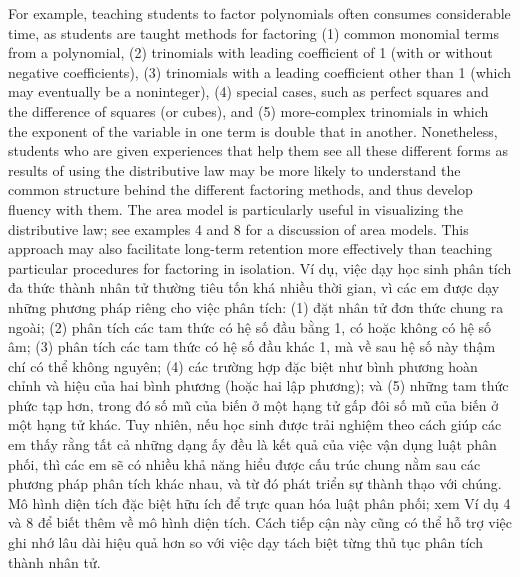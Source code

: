 \documentclass[
  10pt,
  a4paper,
  landscape,
  twoside,
  openany
]{scrbook}
\newcommand{\EN}[1]{#1}
\newcommand{\VI}[1]{#1}
\newcounter{example}
\begin{document}
\TriPara
{
\EN{For example, teaching students to factor polynomials often consumes considerable time, as students are taught methods for factoring (1) common monomial terms from a polynomial, (2) trinomials with leading coefficient of 1 (with or without negative coefficients), (3) trinomials with a leading coefficient other than 1 (which may eventually be a noninteger), (4) special cases, such as perfect squares and the difference of squares (or cubes), and (5) more-complex trinomials in which the exponent of the variable in one term is double that in another. Nonetheless, students who are given experiences that help them see all these different forms as results of using the distributive law may be more likely to understand the common structure behind the different factoring methods, and thus develop fluency with them. The area model is particularly useful in visualizing the distributive law; see examples 4 and 8 for a discussion of area models. This approach may also facilitate long-term retention more effectively than teaching particular procedures for factoring in isolation.}
}
{
\VI{Ví dụ, việc dạy học sinh phân tích đa thức thành nhân tử thường tiêu tốn khá nhiều thời gian, vì các em được dạy những phương pháp riêng cho việc phân tích: (1) đặt nhân tử đơn thức chung ra ngoài; (2) phân tích các tam thức có hệ số đầu bằng 1, có hoặc không có hệ số âm; (3) phân tích các tam thức có hệ số đầu khác 1, mà về sau hệ số này thậm chí có thể không nguyên; (4) các trường hợp đặc biệt như bình phương hoàn chỉnh và hiệu của hai bình phương (hoặc hai lập phương); và (5) những tam thức phức tạp hơn, trong đó số mũ của biến ở một hạng tử gấp đôi số mũ của biến ở một hạng tử khác. Tuy nhiên, nếu học sinh được trải nghiệm theo cách giúp các em thấy rằng tất cả những dạng ấy đều là kết quả của việc vận dụng luật phân phối, thì các em sẽ có nhiều khả năng hiểu được cấu trúc chung nằm sau các phương pháp phân tích khác nhau, và từ đó phát triển sự thành thạo với chúng. Mô hình diện tích đặc biệt hữu ích để trực quan hóa luật phân phối; xem Ví dụ 4 và 8 để biết thêm về mô hình diện tích. Cách tiếp cận này cũng có thể hỗ trợ việc ghi nhớ lâu dài hiệu quả hơn so với việc dạy tách biệt từng thủ tục phân tích thành nhân tử.}
}
\end{document}
